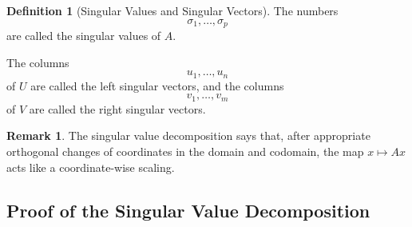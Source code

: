 \documentclass[12pt,oneside]{book}
\numberwithin{equation}{section}
\theoremstyle{definition}
\newtheorem{definition}{Definition}[section]
\newtheorem{remark}{Remark}[section]
\theoremstyle{plain}
\theoremstyle{remark}
\begin{document}
\begin{definition}[Singular Values and Singular Vectors]
The numbers
\[
\sigma_1,\dots,\sigma_p
\]
are called the singular values of $A$.

The columns
\[
u_1,\dots,u_n
\]
of $U$ are called the left singular vectors, and the columns
\[
v_1,\dots,v_m
\]
of $V$ are called the right singular vectors.
\end{definition}

\begin{remark}
The singular value decomposition says that, after appropriate orthogonal changes of coordinates in the domain and codomain, the map $x\mapsto Ax$ acts like a coordinate-wise scaling.
\end{remark}

\subsection{Proof of the Singular Value Decomposition}
\end{document}
